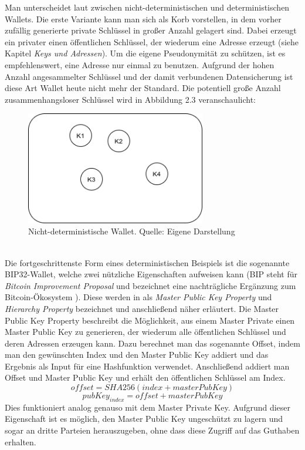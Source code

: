 Man unterscheidet laut \cite{antanopoulos_2014} zwischen nicht-deterministischen und deterministischen Wallets. Die erste Variante kann man sich als Korb vorstellen, in dem vorher zufällig generierte private Schlüssel in großer Anzahl gelagert sind. Dabei erzeugt ein privater einen öffentlichen Schlüssel, der wiederum eine Adresse erzeugt (siehe Kapitel \emph{Keys und Adressen}).
Um die eigene Pseudonymität zu schützen, ist es empfehlenswert, eine Adresse nur einmal zu benutzen. Aufgrund der hohen Anzahl angesammelter Schlüssel und der damit verbundenen Datensicherung ist diese Art Wallet heute nicht mehr der Standard. Die potentiell große Anzahl zusammenhangsloser Schlüssel wird in Abbildung 2.3 veranschaulicht:
\begin{figure}[htpb]
	\centering
	\includegraphics[width=0.7\textwidth]{images/non_det_wallet.png}
	\caption{Nicht-deterministische Wallet.
	Quelle: Eigene Darstellung}
	\label{6braun:fig:non-deterministic_wallet}
\end{figure}\\
Die fortgeschrittenste Form eines deterministischen Beispiels ist die sogenannte BIP32-Wallet, welche zwei nützliche Eigenschaften aufweisen kann (BIP steht für \emph{Bitcoin Improvement Proposal} und bezeichnet eine nachträgliche Ergänzung zum Bitcoin-Ökosystem \cite[]{antanopoulos_2014}).
Diese werden in \cite{buterin_2013} als \emph{Master Public Key Property} und \emph{Hierarchy Property} bezeichnet und anschließend näher erläutert.
Die Master Public Key Property beschreibt die Möglichkeit, aus einem Master Private einen Master Public Key zu generieren, der wiederum alle öffentlichen Schlüssel und deren Adressen erzeugen kann. Dazu berechnet man das sogenannte Offset, indem man den gewünschten Index und den Master Public Key addiert und das Ergebnis als Input für eine Hashfunktion verwendet. Anschließend addiert man Offset und Master Public Key und erhält den öffentlichen Schlüssel am Index.
$$offset = SHA256(index + masterPubKey)$$
$$pubKey_{index} = offset + masterPubKey$$ Dies funktioniert analog genauso mit dem Master Private Key. 
Aufgrund dieser Eigenschaft ist es möglich, den Master Public Key ungeschützt zu lagern und sogar an dritte Parteien herauszugeben, ohne dass diese Zugriff auf das Guthaben erhalten.\\

